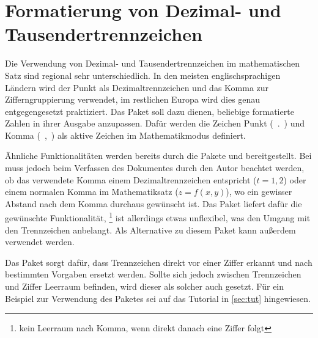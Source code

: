 \section[%
  Das Paket \Package{mathswap} -- Dezimal- und Tausendertrennzeichen%
]{%
  Formatierung von Dezimal- und Tausendertrennzeichen%
}
%
\begin{DeclareEntity}{}
Die Verwendung von Dezimal- und Tausendertrennzeichen im mathematischen Satz 
sind regional sehr unterschiedlich. In den meisten englischsprachigen Ländern 
wird der Punkt als Dezimaltrennzeichen und das Komma zur Zifferngruppierung 
verwendet, im restlichen Europa wird dies genau entgegengesetzt praktiziert.
Das Paket  soll dazu dienen, beliebige formatierte Zahlen in 
ihrer Ausgabe anzupassen. Dafür werden die Zeichen Punkt (\ .\ ) und Komma (\ 
,\ ) als aktive Zeichen im Mathematikmodus definiert.

Ähnliche Funktionalitäten werden bereits durch die Pakete  und 
\Package{ziffer} bereitgestellt. Bei \Package{icomma} muss jedoch beim
Verfassen des Dokumentes durch den Autor beachtet werden, ob das verwendete
Komma einem Dezimaltrennzeichen entspricht ($t=1,\!2$) oder einem normalen 
Komma im Mathematiksatz ($z=f(x,y)$), wo ein gewisser Abstand nach dem Komma 
durchaus gewünscht ist. Das Paket \Package{ziffer} liefert dafür die gewünschte 
Funktionalität,%
\footnote{kein Leerraum nach Komma, wenn direkt danach eine Ziffer folgt}
ist allerdings etwas unflexibel, was den Umgang mit den Trennzeichen anbelangt.
Als Alternative zu diesem Paket kann außerdem \Package{ionumbers} verwendet 
werden.

Das Paket  sorgt dafür, dass Trennzeichen direkt vor einer 
Ziffer erkannt und nach bestimmten Vorgaben ersetzt werden. Sollte sich jedoch 
zwischen Trennzeichen und Ziffer Leerraum befinden, wird dieser als solcher
auch gesetzt. Für ein Beispiel zur Verwendung des Paketes sei auf das Tutorial 
\Tutorial{mathswap} in \autoref{sec:tut} hingewiesen.


\end{DeclareEntity}
